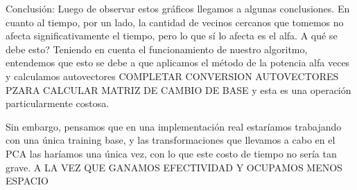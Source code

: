 Conclusión:
Luego de observar estos gráficos llegamos a algunas conclusiones.
En cuanto al tiempo, por un lado, la cantidad de vecinos cercanos que tomemos no afecta significativamente el tiempo, pero lo que sí lo afecta es el alfa.
A qué se debe esto? Teniendo en cuenta el funcionamiento de nuestro algoritmo, entendemos que esto se debe a que aplicamos el método de la potencia alfa veces y calculamos autovectores COMPLETAR CONVERSION AUTOVECTORES PZARA CALCULAR MATRIZ DE CAMBIO DE BASE y esta es una operación particularmente costosa.

Sin embargo, pensamos que en una implementación real estaríamos trabajando con una única training base, y las transformaciones que llevamos a cabo en el PCA las haríamos una única vez, con lo que este costo de tiempo no sería tan grave. A LA VEZ QUE GANAMOS EFECTIVIDAD Y OCUPAMOS MENOS ESPACIO